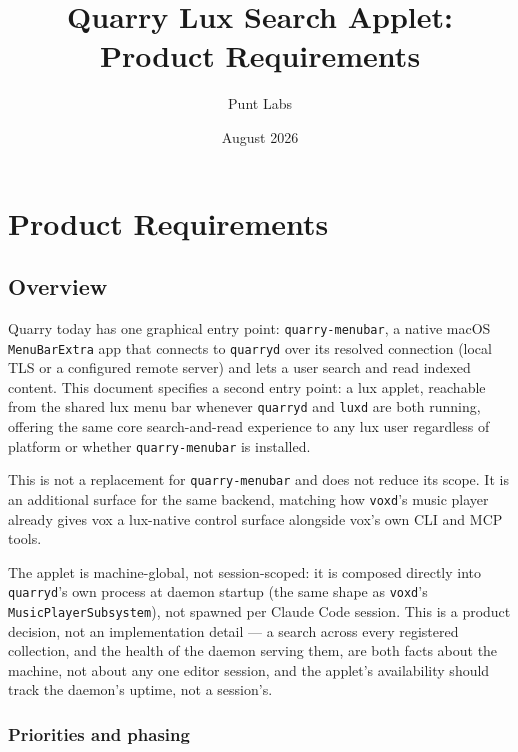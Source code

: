 \documentclass[a4paper,11pt]{report}
\begin{document}
\title{Quarry Lux Search Applet: Product Requirements}
\author{Punt Labs}
\date{August 2026}
\maketitle
\tableofcontents

\chapter{Product Requirements}

\section{Overview}
\label{sec:overview}

Quarry today has one graphical entry point: \texttt{quarry-menubar}, a
native macOS \texttt{MenuBarExtra} app that connects to \texttt{quarryd}
over its resolved connection (local TLS or a configured remote server) and
lets a user search and read indexed content. This document specifies a
second entry point: a lux applet, reachable from the shared lux menu bar
whenever \texttt{quarryd} and \texttt{luxd} are both running, offering the
same core search-and-read experience to any lux user regardless of
platform or whether \texttt{quarry-menubar} is installed.

This is not a replacement for \texttt{quarry-menubar} and does not reduce
its scope. It is an additional surface for the same backend, matching how
\texttt{voxd}'s music player already gives vox a lux-native control surface
alongside vox's own CLI and MCP tools.

The applet is machine-global, not session-scoped: it is composed directly
into \texttt{quarryd}'s own process at daemon startup (the same shape as
\texttt{voxd}'s \texttt{MusicPlayerSubsystem}), not spawned per Claude Code
session. This is a product decision, not an implementation detail --- a
search across every registered collection, and the health of the daemon
serving them, are both facts about the machine, not about any one editor
session, and the applet's availability should track the daemon's uptime,
not a session's.

\subsection{Priorities and phasing}
\end{document}
